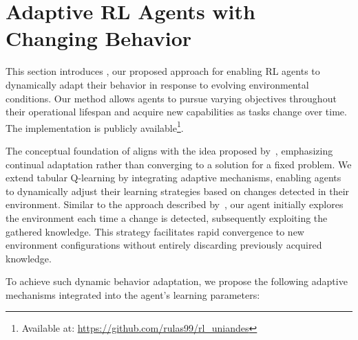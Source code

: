 
\section{Adaptive \ac{RL} Agents with Changing Behavior}
\label{sec:implementation}

This section introduces \adaptiverl, our proposed approach for enabling \ac{RL} agents to dynamically adapt their behavior in response to evolving environmental conditions. Our method allows agents to pursue varying objectives throughout their operational lifespan and acquire new capabilities as tasks change over time. The implementation is publicly available\footnote{Available at: \url{https://github.com/rulas99/rl_uniandes}}.

The conceptual foundation of \adaptiverl aligns with the idea proposed by~\citet{abel2023definitioncontinualreinforcementlearning}, emphasizing continual adaptation rather than converging to a solution for a fixed problem. We extend tabular Q-learning by integrating adaptive mechanisms, enabling agents to dynamically adjust their learning strategies based on changes detected in their environment. Similar to the approach described by~\citet{norman2024firstexploreexploitmetalearningsolve}, our agent initially explores the environment each time a change is detected, subsequently exploiting the gathered knowledge. This strategy facilitates rapid convergence to new environment configurations without entirely discarding previously acquired knowledge.

To achieve such dynamic behavior adaptation, we propose the following adaptive mechanisms integrated into the agent’s learning parameters:

